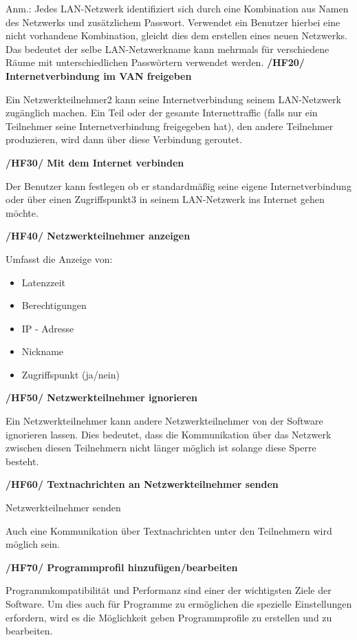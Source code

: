 \documentclass[a4paper,12pt]{scrreprt}
\begin{document}
		Anm.: Jedes LAN-Netzwerk identifiziert sich durch eine Kombination aus Namen des Netzwerks und zusätzlichem Passwort. Verwendet ein Benutzer hierbei eine nicht vorhandene Kombination, gleicht dies dem erstellen eines neuen Netzwerks. Das bedeutet der selbe LAN-Netzwerkname kann mehrmals für verschiedene Räume mit unterschiedlichen Passwörtern verwendet werden.
		\textbf { /HF20/ Internetverbindung im VAN freigeben} 
		
		Ein Netzwerkteilnehmer2 kann seine Internetverbindung seinem LAN-Netzwerk zugänglich machen. Ein Teil oder der gesamte Internettraffic (falls nur ein Teilnehmer seine Internetverbindung freigegeben hat), den andere Teilnehmer produzieren, wird dann über diese Verbindung geroutet.
		
		\textbf {/HF30/ Mit dem Internet verbinden} 
		
		Der Benutzer kann festlegen ob er standardmäßig seine eigene Internetverbindung oder über einen Zugriffspunkt3 in seinem LAN-Netzwerk ins Internet gehen möchte.
		
		\textbf { /HF40/ Netzwerkteilnehmer anzeigen
		}
				
		Umfasst die Anzeige von:
		\begin{itemize}
		
	
		\item Latenzzeit
		\item Berechtigungen
		\item IP - Adresse
		\item Nickname
		\item Zugriffspunkt (ja/nein)\\
			\end{itemize}
		
		\textbf {/HF50/ Netzwerkteilnehmer ignorieren
		}
		
		Ein Netzwerkteilnehmer kann andere Netzwerkteilnehmer von der Software ignorieren lassen. Dies bedeutet, dass die Kommunikation über das Netzwerk zwischen diesen Teilnehmern nicht länger möglich ist solange diese Sperre besteht.
		
		
		
		\textbf {/HF60/ Textnachrichten an Netzwerkteilnehmer senden}
		
		Netzwerkteilnehmer senden
		
		Auch eine Kommunikation über Textnachrichten unter den Teilnehmern wird möglich sein.
		
		 \textbf {/HF70/ Programmprofil hinzufügen/bearbeiten}
		
		Programmkompatibilität und Performanz sind einer der wichtigsten Ziele der Software. Um dies auch für Programme zu ermöglichen die spezielle Einstellungen erfordern, wird es die Möglichkeit geben Programmprofile zu erstellen und zu bearbeiten.
\end{document}
